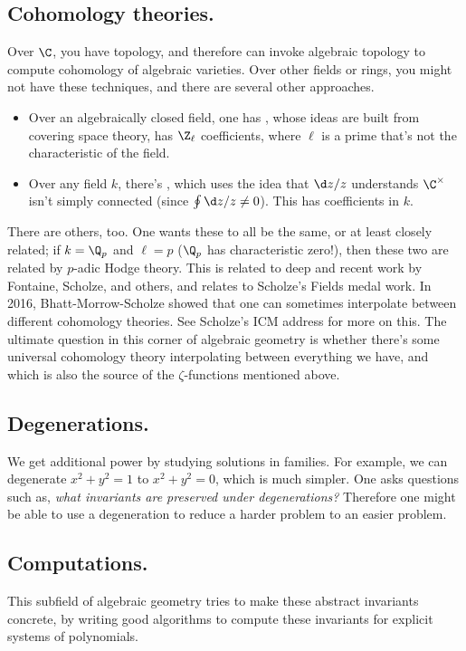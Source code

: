 \subsection*{Cohomology theories.}
Over $\C$, you have topology, and therefore can invoke algebraic topology to compute cohomology of algebraic
varieties. Over other fields or rings, you might not have these techniques, and there are several other
approaches.
\begin{itemize}
	\item Over an algebraically closed field, one has , whose ideas are built from covering
	space theory, has $\Z_\ell$ coefficients, where $\ell$ is a prime that's not the characteristic of the field.
	\item Over any field $k$, there's , which uses the idea that $\d z/z$ understands
	$\C^\times$ isn't simply connected (since $\oint \d z/z\ne 0$). This has coefficients in $k$.
\end{itemize}
There are others, too. One wants these to all be the same, or at least closely related; if $k = \Q_p$ and $\ell =
p$ ($\Q_p$ has characteristic zero!), then these two are related by $p$-adic Hodge theory. This is related to deep
and recent work by Fontaine, Scholze, and others, and relates to Scholze's Fields medal work. In 2016,
Bhatt-Morrow-Scholze showed that one can sometimes interpolate between different cohomology theories. See Scholze's
ICM address for more on this. The ultimate question in this corner of algebraic geometry is whether there's some
universal cohomology theory interpolating between everything we have, and which is also the source of the
$\zeta$-functions mentioned above.
\subsection*{Degenerations.}
We get additional power by studying solutions in families. For example, we can degenerate $x^2+y^2=1$ to
$x^2+y^2=0$, which is much simpler. One asks questions such as, \emph{what invariants are preserved under
degenerations?} Therefore one might be able to use a degeneration to reduce a harder problem to an easier problem.
\subsection*{Computations.}
This subfield of algebraic geometry tries to make these abstract invariants concrete, by writing good algorithms to
compute these invariants for explicit systems of polynomials.
